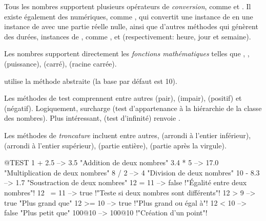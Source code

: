 \documentclass[a4paper,10pt,twoside]{book}
\begin{document}
Tous les nombres supportent plusieurs opérateurs de  \emph{conversion}, comme  et . Il existe également des  numériques,
comme , qui convertit une instance de  en
une instance de  avec une partie réelle nulle, ainsi
que d'autres méthodes qui génèrent des durées, instances de
, comme , 
et 
(respectivement: heure, jour et semaine).

Les nombres supportent directement les \emph{fonctions
  mathématiques} telles que ,
,  
(puissance),
(carré),
(racine carrée).

 utilise la méthode abstraite
 (la base par défaut est 10).

Les méthodes de test comprennent entre autres 
(pair), 
(impair), 
(positif)
 et 
(négatif).
Logiquement,  surcharge  
(test d'appartenance à la hiérarchie de la classe des nombres).
Plus intéressant,  
(test d'infinité)
renvoie .

Les méthodes de \emph{troncature} incluent entre autres,
(arrondi à l'entier inférieur),
(arrondi à l'entier supérieur), 
(partie entière), 
(partie après la virgule).

\begin{code}{@TEST}
1 + 2.5     --> 3.5             "Addition de deux nombres"
3.4 * 5      --> 17.0           "Multiplication de deux nombres"
8 / 2         --> 4                 "Division de deux nombres"
10 - 8.3   --> 1.7             "Soustraction de deux nombres"
12 = 11    --> false           !"Égalité entre deux nombres"!
12 ~= 11 --> true            !"Teste si deux nombres sont différents"!
12 > 9      --> true            "Plus grand que"
12 >= 10  --> true            !"Plus grand ou égal à"!
12 < 10    --> false           "Plus petit que"
100@10   --> 100@10    !"Création d'un point"!
\end{code}
\end{document}
